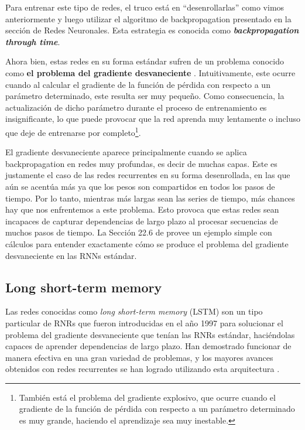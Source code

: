 \documentclass[../../main.tex]{subfiles}
\begin{document}
Para entrenar este tipo de redes, el truco está en ``desenrollarlas'' como vimos
anteriormente y luego utilizar el algoritmo de backpropagation presentado en la sección de
Redes Neuronales. Esta estrategia es conocida como \textbf{\textit{backpropagation through
time}}.

Ahora bien, estas redes en su forma estándar sufren de un problema conocido como
\textbf{el problema del gradiente desvaneciente} \cite{vanishing-gradient}.
Intuitivamente, este ocurre cuando al calcular el gradiente de la función de pérdida con
respecto a un parámetro determinado, este resulta ser muy pequeño. Como consecuencia, la
actualización de dicho parámetro durante el proceso de entrenamiento es insignificante, lo
que puede provocar que la red aprenda muy lentamente o incluso que deje de entrenarse por
completo\footnote{También está el problema del gradiente explosivo, que ocurre cuando el
gradiente de la función de pérdida con respecto a un parámetro determinado es muy grande,
haciendo el aprendizaje sea muy inestable.}.

El gradiente desvaneciente aparece principalmente cuando se aplica backpropagation en
redes muy profundas, es decir de muchas capas. Este es justamente el caso de las redes
recurrentes en su forma desenrollada, en las que aún se acentúa más ya que los pesos son
compartidos en todos los pasos de tiempo. Por lo tanto, mientras más largas sean las
series de tiempo, más chances hay que nos enfrentemos a este problema. Esto provoca que
estas redes sean incapaces de capturar dependencias de largo plazo al procesar secuencias
de muchos pasos de tiempo. La Sección 22.6 de \cite{ai-a-modern-approach} provee un
ejemplo simple con cálculos para entender exactamente cómo se produce el problema
del gradiente desvaneciente en las RNNs estándar.

\subsection{Long short-term memory}
Las redes conocidas como \textit{long short-term memory} (LSTM) son un tipo particular de
RNRs que fueron introducidas en el año 1997 \cite{lstm-paper-1997} para solucionar el
problema del gradiente desvaneciente que tenían las RNRs estándar, haciéndolas capaces
de aprender dependencias de largo plazo. Han demostrado funcionar de manera efectiva en
una gran variedad de problemas, y los mayores avances obtenidos con redes recurrentes se
han logrado utilizando esta arquitectura \cite{colahs-blog-lstm-2015}.
\end{document}
